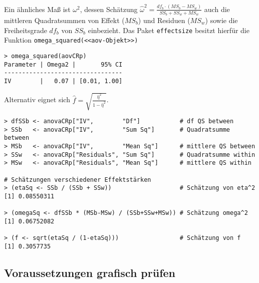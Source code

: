 Ein ähnliches Maß ist $\omega^{2}$, dessen Schätzung $\hat{\omega}^{2} = \frac{df_{b} \cdot (MS_{b}-MS_{w})}{SS_{b} + SS_{w} + MS_{w}}$ auch die mittleren Quadratsummen von Effekt ($MS_{b}$) und Residuen ($MS_{w}$) sowie die Freiheitsgrade $df_{b}$ von $SS_{b}$ einbezieht. Das Paket \lstinline!effectsize! besitzt hierfür die Funktion \lstinline!omega_squared(<<aov-Objekt>>)!
\begin{lstlisting}
> omega_squared(aovCRp)
Parameter | Omega2 |       95% CI
---------------------------------
IV        |   0.07 | [0.01, 1.00]
\end{lstlisting}

Alternativ eignet sich $\hat{f} = \sqrt{\frac{\hat{\eta}^{2}}{1-\hat{\eta}^{2}}}$.
\begin{lstlisting}
> dfSSb <- anovaCRp["IV",        "Df"]           # df QS between
> SSb   <- anovaCRp["IV",        "Sum Sq"]       # Quadratsumme between
> MSb   <- anovaCRp["IV",        "Mean Sq"]      # mittlere QS between
> SSw   <- anovaCRp["Residuals", "Sum Sq"]       # Quadratsumme within
> MSw   <- anovaCRp["Residuals", "Mean Sq"]      # mittlere QS within

# Schätzungen verschiedener Effektstärken
> (etaSq <- SSb / (SSb + SSw))                   # Schätzung von eta^2
[1] 0.08550311

> (omegaSq <- dfSSb * (MSb-MSw) / (SSb+SSw+MSw)) # Schätzung omega^2
[1] 0.06752082

> (f <- sqrt(etaSq / (1-etaSq)))                 # Schätzung von f
[1] 0.3057735
\end{lstlisting}

\subsection{Voraussetzungen grafisch prüfen}

